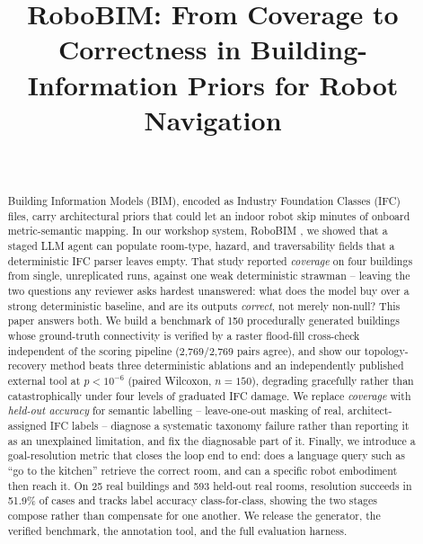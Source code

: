 \documentclass[a4paper, 10pt, conference]{ieeeconf}
\title{\LARGE \bf RoboBIM: From Coverage to Correctness in Building-Information Priors for Robot Navigation}
\author{
\authorblockN{Ashwin Nedungadi$^{*}$, Bharathi Kannan Nithyanantham$^{*}$, and Stefan Luedtke\thanks{$^{*}$Equal contribution.}}\\
\authorblockA{\textit{Institute for Visual \& Analytical Computing, Universit\"at Rostock} \\
\{ashwin.nedungadi, bharathikannan.nithyanantham, stefan.luedtke\}@uni-rostock.de}
}
\begin{document}
\maketitle
\thispagestyle{empty}
\pagestyle{empty}

\begin{abstract}
Building Information Models (BIM), encoded as Industry Foundation Classes (IFC) files, carry architectural priors that could let an indoor robot skip minutes of onboard metric-semantic mapping. In our workshop system, RoboBIM \cite{nedungadi2026robobimws}, we showed that a staged LLM agent can populate room-type, hazard, and traversability fields that a deterministic IFC parser leaves empty. That study reported \emph{coverage} on four buildings from single, unreplicated runs, against one weak deterministic strawman -- leaving the two questions any reviewer asks hardest unanswered: what does the model buy over a strong deterministic baseline, and are its outputs \emph{correct}, not merely non-null? This paper answers both. We build a benchmark of 150 procedurally generated buildings whose ground-truth connectivity is verified by a raster flood-fill cross-check independent of the scoring pipeline (2{,}769/2{,}769 pairs agree), and show our topology-recovery method beats three deterministic ablations and an independently published external tool at $p<10^{-6}$ (paired Wilcoxon, $n=150$), degrading gracefully rather than catastrophically under four levels of graduated IFC damage. We replace \emph{coverage} with \emph{held-out accuracy} for semantic labelling -- leave-one-out masking of real, architect-assigned IFC labels -- diagnose a systematic taxonomy failure rather than reporting it as an unexplained limitation, and fix the diagnosable part of it. Finally, we introduce a goal-resolution metric that closes the loop end to end: does a language query such as ``go to the kitchen'' retrieve the correct room, and can a specific robot embodiment then reach it. On 25 real buildings and 593 held-out real rooms, resolution succeeds in 51.9\% of cases and tracks label accuracy class-for-class, showing the two stages compose rather than compensate for one another. We release the generator, the verified benchmark, the annotation tool, and the full evaluation harness.
\end{abstract}

\end{document}
